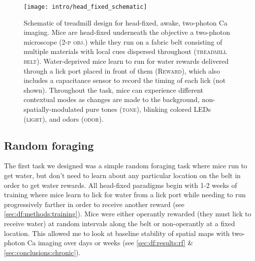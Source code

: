 \begin{figure}
	\centering
	\texttt{[image: intro/head\_fixed\_schematic]}
	\caption[Schematic of treadmill design for head-fixed, awake, two-photon Ca imaging]{Schematic of treadmill design for head-fixed, awake, two-photon Ca imaging.
	Mice are head-fixed underneath the objective a two-photon microscope (\textsc{2-p obj.}) while they run on a fabric belt consisting of multiple materials with local cues dispersed throughout (\textsc{treadmill belt}).
	Water-deprived mice learn to run for water rewards delivered through a lick port placed in front of them (\textsc{Reward}), which also includes a capacitance sensor to record the timing of each lick (not shown).
	Throughout the task, mice can experience different contextual modes as changes are made to the background, non-spatially-modulated pure tones (\textsc{tone}), blinking colored LEDs (\textsc{light}), and odors (\textsc{odor}).
	}
	\label{fig:intro:techniques:treadmill_schematic}
\end{figure}

\subsection{Random foraging}
The first task we designed was a simple random foraging task where mice run to get water, but don't need to learn about any particular location on the belt in order to get water rewards.
All head-fixed paradigms begin with 1-2 weeks of training where mice learn to lick for water from a lick port while needing to run progressively farther in order to receive another reward (see \autoref{sec:df:methods:training}).
Mice were either operantly rewarded (they must lick to receive water) at random intervals along the belt or non-operantly at a fixed location.
This allowed me to look at baseline stability of spatial maps with two-photon Ca imaging over days or weeks (see \autoref{sec:df:results:rf} \& \autoref{sec:conclusions:chronic}).


